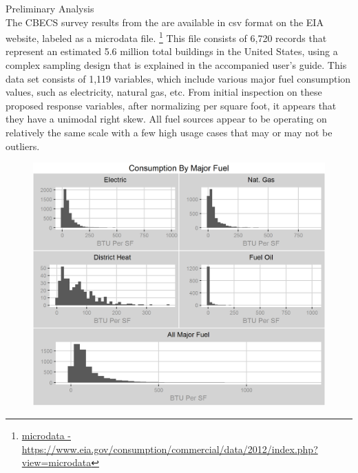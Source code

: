 {\Large {Preliminary Analysis}}
\\
The CBECS survey results from the are available in csv format on the EIA website, labeled as a microdata file. \footnote{\href{https://www.eia.gov/consumption/commercial/data/2012/index.php?view=microdata}{microdata - \url{https://www.eia.gov/consumption/commercial/data/2012/index.php?view=microdata}}}  This file consists of 6,720 records that represent an estimated 5.6 million total buildings in the United States, using a complex sampling design that is explained in the accompanied user's guide.  This data set consists of 1,119 variables, which include various major fuel consumption values, such as electricity, natural gas, etc.  From initial inspection on these proposed response variables, after normalizing per square foot, it appears that they have a unimodal right skew.  All fuel sources appear to be operating on relatively the same scale with a few high usage cases that may or may not be outliers. \\

\begin{figure}[h]
\includegraphics[width=\textwidth]{major_fuels_preliminary_analysis.png}
\centering
\end{figure}
